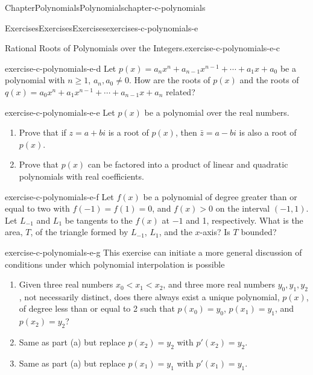 \documentclass[oneside,10pt,]{book}
\numberwithin{equation}{section}
\newcommand{\lt}{<}
\begin{document}
\begin{chapterptx}{Chapter}{Polynomials}{}{Polynomials}{}{}{chapter-c-polynomials}
\begin{exercises-section}{Exercises}{Exercises}{}{Exercises}{}{}{exercises-c-polynomials-e}
\begin{divisionexercise}{2}{Rational Roots of Polynomials over the Integers.}{}{exercise-c-polynomials-e-c}
%
\end{divisionexercise}%
\begin{divisionexercise}{3}{}{}{exercise-c-polynomials-e-d}%
Let \(p(x)= a_n x^n + a_{n-1}x^{n-1}+ \cdots +a_1 x + a_0\) be a polynomial with \(n\geq 1\), \(a_n, a_0 \neq 0\). How are the roots of \(p(x)\) and the roots of  \(q(x)= a_0 x^n + a_1 x^{n-1}+ \cdots +a_{n-1} x + a_n\) related?%
\end{divisionexercise}%
\begin{divisionexercise}{4}{}{}{exercise-c-polynomials-e-e}%
Let \(p(x)\) be a polynomial over the real numbers.%
\begin{enumerate}[label=(\alph*)]
\item{}Prove that if \(z=a + b i\) is a root of \(p(x)\), then \(\bar{z}= a -b i\) is also a root of \(p(x)\).%
\item{}Prove that \(p(x)\) can be factored into a product of linear and quadratic polynomials with real coefficients.%
\end{enumerate}
%
\end{divisionexercise}%
\begin{divisionexercise}{5}{}{}{exercise-c-polynomials-e-f}%
Let \(f(x)\) be a polynomial of degree greater than or equal to two with \(f(-1)=f(1)=0\), and \(f(x)>0\) on the interval \((-1,1)\).  Let \(L_{-1}\) and \(L_1\) be tangents to the \(f(x)\) at \(-1\) and 1, respectively. What is the area, \(T\), of the triangle formed by \(L_{-1}\), \(L_1\), and the \(x\)-axis?  Is \(T\) bounded?%
\end{divisionexercise}%
\begin{divisionexercise}{6}{}{}{exercise-c-polynomials-e-g}%
This exercise can initiate a more general discussion of conditions under which polynomial interpolation is possible%
\begin{enumerate}[label=(\alph*)]
\item{}Given three real numbers \(x_0 \lt x_1 \lt x_2\), and three more real numbers \(y_0, y_1, y_2\), not necessarily distinct, does there always exist a unique polynomial, \(p(x)\), of degree less than or equal to 2 such that \(p\left(x_0\right)=y_0\), \(p\left(x_1\right)=y_1\), and \(p\left(x_2\right)=y_2\)?%
\item{}Same as part (a) but replace \(p\left(x_2\right)=y_2\) with \(p'\left(x_2\right)=y_2\).%
\item{}Same as part (a) but replace \(p\left(x_1\right)=y_1\) with \(p'\left(x_1\right)=y_1\).%
\end{enumerate}
%
\end{divisionexercise}%

\end{exercises-section}
\end{chapterptx}
\end{document}
